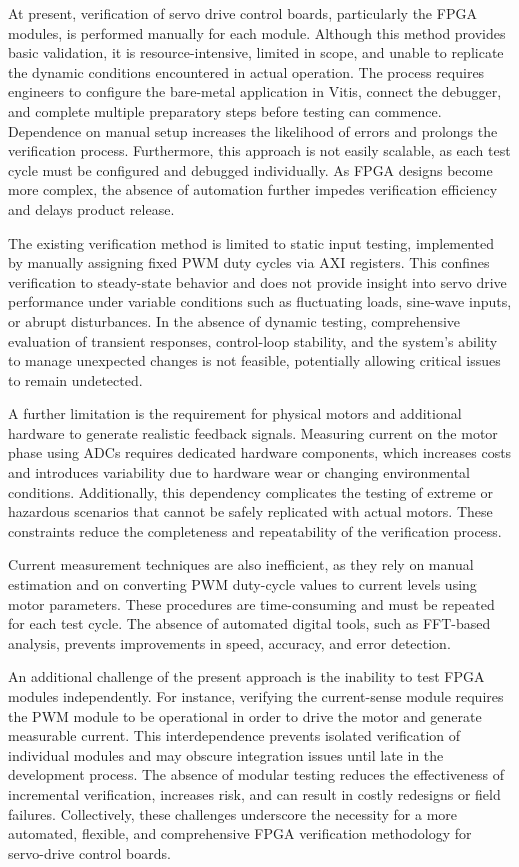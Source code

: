 At present, verification of servo drive control boards, particularly the \acs{FPGA} modules, is performed manually for each module. Although this method provides basic validation, it is resource-intensive, limited in scope, and unable to replicate the dynamic conditions encountered in actual operation. The process requires engineers to configure the bare-metal application in Vitis, connect the debugger, and complete multiple preparatory steps before testing can commence. Dependence on manual setup increases the likelihood of errors and prolongs the verification process. Furthermore, this approach is not easily scalable, as each test cycle must be configured and debugged individually. As \acs{FPGA} designs become more complex, the absence of automation further impedes verification efficiency and delays product release.

The existing verification method is limited to static input testing, implemented by manually assigning fixed \acs{PWM} duty cycles via \acs{AXI} registers. This confines verification to steady-state behavior and does not provide insight into servo drive performance under variable conditions such as fluctuating loads, sine-wave inputs, or abrupt disturbances. In the absence of dynamic testing, comprehensive evaluation of transient responses, control-loop stability, and the system's ability to manage unexpected changes is not feasible, potentially allowing critical issues to remain undetected.

A further limitation is the requirement for physical motors and additional hardware to generate realistic feedback signals. Measuring current on the motor phase using \acs{ADC}s requires dedicated hardware components, which increases costs and introduces variability due to hardware wear or changing environmental conditions. Additionally, this dependency complicates the testing of extreme or hazardous scenarios that cannot be safely replicated with actual motors. These constraints reduce the completeness and repeatability of the verification process.

Current measurement techniques are also inefficient, as they rely on manual estimation and on converting \acs{PWM} duty-cycle values to current levels using motor parameters. These procedures are time-consuming and must be repeated for each test cycle. The absence of automated digital tools, such as \acs{FFT}-based analysis, prevents improvements in speed, accuracy, and error detection.

An additional challenge of the present approach is the inability to test \acs{FPGA} modules independently. For instance, verifying the current-sense module requires the \acs{PWM} module to be operational in order to drive the motor and generate measurable current. This interdependence prevents isolated verification of individual modules and may obscure integration issues until late in the development process. The absence of modular testing reduces the effectiveness of incremental verification, increases risk, and can result in costly redesigns or field failures. Collectively, these challenges underscore the necessity for a more automated, flexible, and comprehensive \acs{FPGA} verification methodology for servo-drive control boards.

